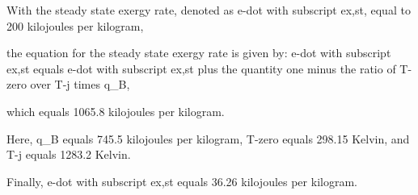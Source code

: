 With the steady state exergy rate, denoted as e-dot with subscript ex,st, equal to 200 kilojoules per kilogram,

the equation for the steady state exergy rate is given by:
e-dot with subscript ex,st equals e-dot with subscript ex,st plus the quantity one minus the ratio of T-zero over T-j times q_B,

which equals 1065.8 kilojoules per kilogram.

Here, q_B equals 745.5 kilojoules per kilogram,
T-zero equals 298.15 Kelvin,
and T-j equals 1283.2 Kelvin.

Finally, e-dot with subscript ex,st equals 36.26 kilojoules per kilogram.